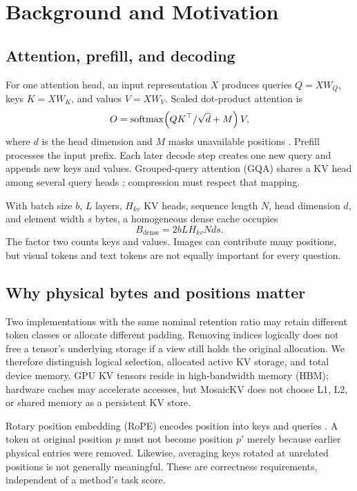 \section{Background and Motivation}
\label{sec:background}
\subsection{Attention, prefill, and decoding}
For one attention head, an input representation $X$ produces queries $Q=XW_Q$,
keys $K=XW_K$, and values $V=XW_V$. Scaled dot-product attention is
\begin{equation}
 O=\operatorname{softmax}\!\left(QK^\top/\sqrt{d}+M\right)V,
\end{equation}
where $d$ is the head dimension and $M$ masks unavailable positions
\citep{vaswani2017attention}. Prefill processes the input prefix. Each later
decode step creates one new query and appends new keys and values. Grouped-query
attention (GQA) shares a KV head among several query heads
\citep{ainslie2023gqa}; compression must respect that mapping.

With batch size $b$, $L$ layers, $H_{kv}$ KV heads, sequence length $N$, head
dimension $d$, and element width $s$ bytes, a homogeneous dense cache occupies
\begin{equation}
 B_{\mathrm{dense}}=2bLH_{kv}Nds.
 \label{eq:dense}
\end{equation}
The factor two counts keys and values. Images can contribute many positions,
but visual tokens and text tokens are not equally important for every question.

\subsection{Why physical bytes and positions matter}
Two implementations with the same nominal retention ratio may retain different
token classes or allocate different padding. Removing indices logically does
not free a tensor's underlying storage if a view still holds the original
allocation. We therefore distinguish logical selection, allocated active KV
storage, and total device memory. GPU KV tensors reside in high-bandwidth
memory (HBM); hardware caches may accelerate accesses, but MosaicKV does not
choose L1, L2, or shared memory as a persistent KV store.

Rotary position embedding (RoPE) encodes position into keys and queries
\citep{su2021rope}. A token at original position $p$ must not become position
$p'$ merely because earlier physical entries were removed. Likewise, averaging
keys rotated at unrelated positions is not generally meaningful. These are
correctness requirements, independent of a method's task score.

